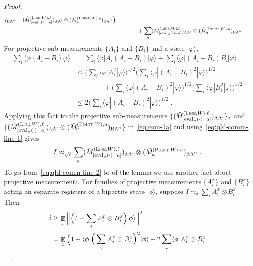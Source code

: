 \documentclass[11pt]{article}
\theoremstyle{definition}
\newcommand{\ket}[1]{|#1\rangle}
\newcommand{\bra}[1]{\langle#1|}
\newcommand{\Id}{\ensuremath{I}}
\newcommand{\ot}{\otimes}
\newcommand{\eps}{\varepsilon}
\newcommand{\E}{\mathop{\mathbb{E}}\displaylimits}
\newcommand{\labelstyle}[1]{\ensuremath{\textsc{#1}}\xspace}
\newcommand{\alice}{\labelstyle{A}}
\newcommand{\bob}{\labelstyle{B}}
\newcommand{\typestyle}[1]{\ensuremath{\textsc{#1}}\xspace}
\renewcommand{\line}{\mathbf{\ell}}
\newcommand{\Point}{\typestyle{Point}}
\newcommand{\Line}{\typestyle{Line}}
\newcommand{\eval}{\mathrm{eval}}
\begin{document}
\begin{proof}
\begin{align}
                                                               I_{\bob
                                                               \alice''}-(\hat{M}^{(\Line,W),\line}_{[\eval_u(\cdot) = a]})_{\alice \alice'} \otimes (\hat{M}^{(\Point,W),u}_{a})_{\bob \alice''}\Big) \notag\\
&\qquad\qquad + \sum_a (\hat{M}^{(\Line,W),\line}_{[\eval_u(\cdot) = a]})_{\alice \alice'} \otimes (\hat{M}^{(\Point,W),u}_{a})_{\bob \alice''}\;.\label{eq:com-1a}
\end{align}
For projective sub-measurements $\{A_i\}$ and $\{B_i\}$ and a state $\ket{\varphi}$,
\begin{align*}
\sum_i \bra{\varphi}\big(A_i-B_i\big)\ket{\varphi} &= \sum_i \bra{\varphi}A_i(A_i-B_i)\ket{\varphi} + \sum_i \bra{\varphi}(A_i-B_i)B_i\ket{\varphi}\\
&\leq \Big(\sum_i \bra{\varphi}A_i^2\ket{\varphi} \Big)^{1/2}\Big(\sum_i \bra{\varphi}(A_i-B_i)^2\ket{\varphi}\Big)^{1/2} \\
&\qquad\qquad+ \Big(\sum_i \bra{\varphi}(A_i-B_i)^2 \ket{\varphi}\Big)^{1/2}\Big(\sum_i \bra{\varphi}B_i^2\ket{\varphi}\Big)^{1/2}\\
&\leq 2\Big(\sum_i \bra{\varphi}(A_i-B_i)^2 \ket{\varphi}\Big)^{1/2}\;.
\end{align*}
Applying this fact to the projective sub-measurements $\{(\hat{M}^{(\Line,W),\line}_{[\eval_u(\cdot) = a]})_{\alice \alice'}\}_a$ and $\{(\hat{M}^{(\Line,W),\line}_{[\eval_u(\cdot) = a]})_{\alice \alice'} \otimes (\hat{M}^{(\Point,W),u}_{a})_{\bob \alice''}\}$ in~\eqref{eq:com-1a} and using~\eqref{eq:qld-comm-line-1} gives
\begin{equation}
\label{eq:qld-comm-line-2}
	\Id \approx_{\sqrt{\eps}} \sum_a (\hat{M}^{(\Line,W),\line}_{[\eval_u(\cdot) = a]})_{\alice \alice'} \otimes (\hat{M}^{(\Point,W),u}_{a})_{\bob \alice''}\;.
      \end{equation}
      To go from~\eqref{eq:qld-comm-line-2} to  of the lemma we use another fact about
      projective measurements. For families of projective measurements $\{A^x_i\}$
      and $\{B^x_i\}$ acting on separate registers of a bipartite state
      $\ket{\phi}$, suppose $I \approx_{\delta} \sum_i A^x_i \ot B^x_i$. Then
      \begin{align*}
        \delta &\geq \E_{x} \Big\| \Big(\Id - \sum_i A^x_i \ot B^x_i\Big) \ket{\phi}\Big\|^2  \\
               &= \E_{x} \Big(1 + \bra{\phi} \Big(\sum_i A^x_i \ot
                 B^x_i\Big)^2 \ket{\phi} - 2 \sum_i \bra{\phi} A^x_i \ot B^x_i

\end{align*}
\end{proof}
\end{document}
